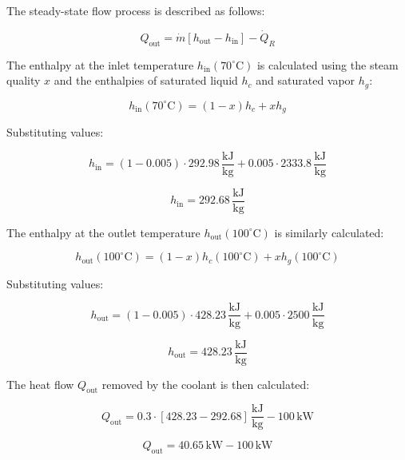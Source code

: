 The steady-state flow process is described as follows:  

\[
Q_{\text{out}} = \dot{m} \left[ h_{\text{out}} - h_{\text{in}} \right] - \dot{Q}_R
\]

The enthalpy at the inlet temperature \( h_{\text{in}}(70^\circ\text{C}) \) is calculated using the steam quality \( x \) and the enthalpies of saturated liquid \( h_c \) and saturated vapor \( h_g \):  

\[
h_{\text{in}}(70^\circ\text{C}) = (1-x) h_c + x h_g
\]

Substituting values:  

\[
h_{\text{in}} = (1-0.005) \cdot 292.98 \, \frac{\text{kJ}}{\text{kg}} + 0.005 \cdot 2333.8 \, \frac{\text{kJ}}{\text{kg}}
\]

\[
h_{\text{in}} = 292.68 \, \frac{\text{kJ}}{\text{kg}}
\]

The enthalpy at the outlet temperature \( h_{\text{out}}(100^\circ\text{C}) \) is similarly calculated:  

\[
h_{\text{out}}(100^\circ\text{C}) = (1-x) h_c(100^\circ\text{C}) + x h_g(100^\circ\text{C})
\]

Substituting values:  

\[
h_{\text{out}} = (1-0.005) \cdot 428.23 \, \frac{\text{kJ}}{\text{kg}} + 0.005 \cdot 2500 \, \frac{\text{kJ}}{\text{kg}}
\]

\[
h_{\text{out}} = 428.23 \, \frac{\text{kJ}}{\text{kg}}
\]

The heat flow \( Q_{\text{out}} \) removed by the coolant is then calculated:  

\[
Q_{\text{out}} = 0.3 \cdot \left[ 428.23 - 292.68 \right] \, \frac{\text{kJ}}{\text{kg}} - 100 \, \text{kW}
\]

\[
Q_{\text{out}} = 40.65 \, \text{kW} - 100 \, \text{kW}
\]